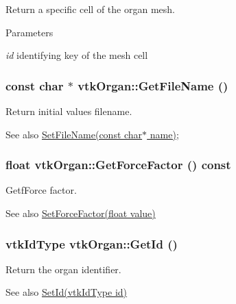 Return a specific cell of the organ mesh. 
\begin{DoxyParams}{Parameters}
\item[{\em id}]identifying key of the mesh cell \end{DoxyParams}
\hypertarget{classvtkOrgan_a83331bddcf2a07b54a5df5e6e23b130f}{
\subsubsection[{GetFileName}]{\setlength{\rightskip}{0pt plus 5cm}const char $\ast$ vtkOrgan::GetFileName ()}}
\label{classvtkOrgan_a83331bddcf2a07b54a5df5e6e23b130f}


Return initial values filename. \begin{DoxySeeAlso}{See also}
\hyperlink{classvtkOrgan_a9fad20fc19aadd62505ed6a39e482d23}{SetFileName(const char$\ast$ name)}; 
\end{DoxySeeAlso}
\hypertarget{classvtkOrgan_a81b39e0f98712affccd17071791f6ad7}{
\subsubsection[{GetForceFactor}]{\setlength{\rightskip}{0pt plus 5cm}float vtkOrgan::GetForceFactor () const}}
\label{classvtkOrgan_a81b39e0f98712affccd17071791f6ad7}


GetfForce factor. \begin{DoxySeeAlso}{See also}
\hyperlink{classvtkOrgan_ae98b19d50a8f351e79e881b579215953}{SetForceFactor(float value)} 
\end{DoxySeeAlso}
\hypertarget{classvtkOrgan_a8e45f79da9c4e7029492ced2f55c25ed}{
\subsubsection[{GetId}]{\setlength{\rightskip}{0pt plus 5cm}vtkIdType vtkOrgan::GetId ()}}
\label{classvtkOrgan_a8e45f79da9c4e7029492ced2f55c25ed}


Return the organ identifier. \begin{DoxySeeAlso}{See also}
\hyperlink{classvtkOrgan_a0aab831b4e0a9d33ba961a0907b73e80}{SetId(vtkIdType id)} 
\end{DoxySeeAlso}


